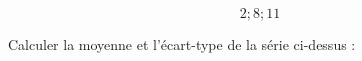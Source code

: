 \documentclass{automatisme}
\begin{document}
\begin{frame}
	$$ 2 ; 8 ; 11 $$

	Calculer la moyenne et l'écart-type de la série ci-dessus :
\end{frame}
\end{document}

